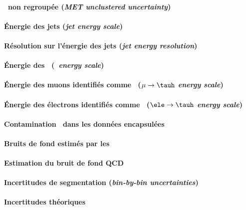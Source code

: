 \paragraph{\MET\ non regroupée (\emph{MET unclustered uncertainty})}

\paragraph{Énergie des jets (\emph{jet energy scale})}

\paragraph{Résolution sur l'énergie des jets (\emph{jet energy resolution})}

\paragraph{Énergie des \tauh\ (\emph{\tauh\ energy scale})}

\paragraph{Énergie des muons identifiés comme \tauh\ (\emph{$\mu\to\tauh$ energy scale})}

\paragraph{Énergie des électrons identifiés comme \tauh\ (\emph{$\ele\to\tauh$ energy scale})}

\paragraph{Contamination \ttbar\ dans les données encapsulées}

\paragraph{Bruits de fond estimés par les \fakefactors}

\paragraph{Estimation du bruit de fond QCD}

\paragraph{Incertitudes de segmentation (\emph{bin-by-bin uncertainties})}

\paragraph{Incertitudes théoriques}
